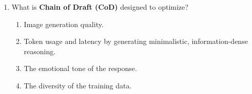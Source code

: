 \documentclass[11pt,a4paper]{article}
\begin{document}
\begin{enumerate}[leftmargin=*, label=\textbf{\#\arabic*}]
  \item What is \textbf{Chain of Draft (CoD)} designed to optimize?
    \begin{enumerate}[label=\Alph*)]
      \item Image generation quality.
      \item Token usage and latency by generating minimalistic, information-dense reasoning.
      \item The emotional tone of the response.
      \item The diversity of the training data.
    \end{enumerate}

\end{enumerate}
\end{document}
